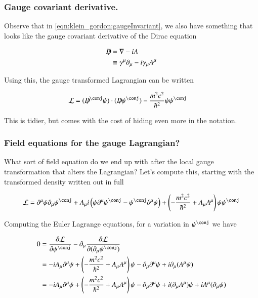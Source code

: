 \subsubsection{Gauge covariant derivative. }

Observe that in \ref{eqn:klein_gordon:gaugeInvariant}, we also have something that looks
like the
gauge covariant derivative of the Dirac equation

\begin{align*}
D\!\!\!/
&= \nabla - i A \\
&\equiv \gamma^\mu \partial_\mu - i \gamma_\mu A^\mu
\end{align*}

Using this, the gauge transformed Lagrangian can be written

\begin{align*}
\LL
&=
(\Dslash^\conj \psi) \cdot (\Dslash \psi^\conj)
- \frac{m^2 c^2}{\hbar^2} \psi {\psi}^\conj
\end{align*}

This is tidier, but comes with the cost of hiding even more in the notation.

\subsubsection{Field equations for the gauge Lagrangian? }

What sort of field equation do we end up with after the local gauge transformation that alters the Lagrangian?  Let's compute this, starting with the transformed density written out in full

\begin{align*}
\LL
&=
\partial^\mu \psi \partial_\mu \psi^\conj
+ A_\mu %
i \left(
\psi \partial^\mu \psi^\conj
-\psi^\conj \partial^\mu \psi
\right) 
+ \left( -\frac{m^2 c^2}{\hbar^2} + A_\mu A^\mu \right) \psi {\psi}^\conj \\
\end{align*}

Computing the Euler Lagrange equations, for a variation in $\psi^\conj$ we have

\begin{align*}
0 &= 
\PD{\psi^\conj}{\LL}
- \partial_\mu \PD{(\partial_\mu \psi^\conj)}{\LL} \\
&= -i A_\mu \partial^\mu \psi
+ \left( -\frac{m^2 c^2}{\hbar^2} + A_\mu A^\mu \right) \psi 
-\partial_\mu \partial^\mu \psi  + i \partial_\mu (A^\mu \psi) \\
&= -i A_\mu \partial^\mu \psi
+ \left( -\frac{m^2 c^2}{\hbar^2} + A_\mu A^\mu \right) \psi 
-\partial_\mu \partial^\mu \psi  
+ i (\partial_\mu A^\mu) \psi 
+ i A^\mu (\partial_\mu \psi) \\
\end{align*}


